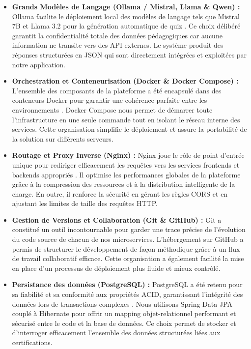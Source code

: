 \begin{itemize}
    \item \textbf{Grands Modèles de Langage (Ollama / Mistral, Llama \& Qwen) :}  
    Ollama facilite le déploiement local des modèles de langage tels que Mistral 7B et Llama 3.2 pour la génération automatique de quiz \cite{novais2025using}. Ce choix délibéré garantit la confidentialité totale des données pédagogiques car aucune information ne transite vers des API externes. Le système produit des réponses structurées en JSON qui sont directement intégrées et exploitées par notre application.
    
    \item \textbf{Orchestration et Conteneurisation (Docker \& Docker Compose) :}  
    L’ensemble des composants de la plateforme a été encapsulé dans des conteneurs Docker pour garantir une cohérence parfaite entre les environnements \cite{ibrahim2021docker}. Docker Compose nous permet de démarrer toute l’infrastructure en une seule commande tout en isolant le réseau interne des services. Cette organisation simplifie le déploiement et assure la portabilité de la solution sur différents serveurs.
    
    \item \textbf{Routage et Proxy Inverse (Nginx) :}
    Nginx joue le rôle de point d’entrée unique pour rediriger efficacement les requêtes vers les services frontends et backends appropriés \cite{reese2008nginx}. Il optimise les performances globales de la plateforme grâce à la compression des ressources et à la distribution intelligente de la charge. En outre, il renforce la sécurité en gérant les règles CORS et en ajustant les limites de taille des requêtes HTTP.
    
    \item \textbf{Gestion de Versions et Collaboration (Git \& GitHub) :}  
    Git a constitué un outil incontournable pour garder une trace précise de l’évolution du code source de chacun de nos microservices. L'hébergement sur GitHub a permis de structurer le développement de façon méthodique grâce à un flux de travail collaboratif efficace. Cette organisation a également facilité la mise en place d'un processus de déploiement plus fluide et mieux contrôlé.
    
    \item \textbf{Persistance des données (PostgreSQL) :}  
    PostgreSQL a été retenu pour sa fiabilité et sa conformité aux propriétés ACID, garantissant l’intégrité des données lors de transactions complexes \cite{google_postgresql}. Nous utilisons Spring Data JPA couplé à Hibernate pour offrir un mapping objet-relationnel performant et sécurisé entre le code et la base de données. Ce choix permet de stocker et d'interroger efficacement l'ensemble des données structurées liées aux certifications.
\end{itemize}

